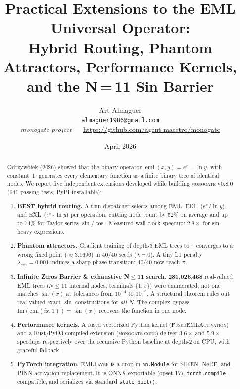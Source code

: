 \documentclass[11pt,a4paper]{article}
\title{%
  Practical Extensions to the EML Universal Operator:\\
  Hybrid Routing, Phantom Attractors, Performance Kernels,\\
  and the N{\,}={\,}11 Sin Barrier
}
\author{Art Almaguer\\
  \small \texttt{almaguer1986@gmail.com}\\[2pt]
  \small \textit{monogate project} --- \url{https://github.com/agent-maestro/monogate}
}
\date{April 2026}
\begin{document}
\maketitle

\begin{abstract}
Odrzyw\'{o}\l{}ek (2026) showed that the binary operator
$\operatorname{eml}(x,y)=e^x - \ln y$, with constant~$1$, generates
every elementary function as a finite binary tree of identical nodes.
We report five independent extensions developed while building
\textsc{monogate} v0.8.0 (641 passing tests, PyPI-installable):

\begin{enumerate}
  \item \textbf{BEST hybrid routing.}
    A thin dispatcher selects among EML, EDL~($e^x/\ln y$), and
    EXL~($e^x \cdot \ln y$) per operation, cutting node count by 52\%
    on average and up to 74\% for Taylor-series $\sin/\cos$.
    Measured wall-clock speedup: $2.8\times$ for sin-heavy expressions.

  \item \textbf{Phantom attractors.}
    Gradient training of depth-3 EML trees to $\pi$ converges to a
    wrong fixed point ($\approx 3.1696$) in 40/40 seeds ($\lambda=0$).
    A tiny L1 penalty $\lambda_{\text{crit}}=0.001$ induces a sharp
    phase transition: 40/40 now reach $\pi$.

  \item \textbf{Infinite Zeros Barrier \& exhaustive N$\leq$11 search.}
    \textbf{281,026,468} real-valued EML trees ($N\leq11$ internal nodes,
    terminals $\{1,x\}$) were enumerated; not one matches $\sin(x)$ at
    tolerances from $10^{-4}$ to $10^{-9}$.
    A structural theorem rules out real-valued exact-$\sin$ constructions
    for \emph{all} $N$.  The complex bypass $\mathrm{Im}(\mathrm{eml}(ix,1))=\sin(x)$
    recovers the function in one node.

  \item \textbf{Performance kernels.}
    A fused vectorized Python kernel (\textsc{FusedEMLActivation}) and a
    Rust/PyO3 compiled extension (\textsc{monogate-core}) deliver $3.6\times$
    and $5.9\times$ speedups respectively over the recursive Python baseline
    at depth-2 on CPU, with graceful fallback.

  \item \textbf{PyTorch integration.}
    \textsc{EMLLayer} is a drop-in \texttt{nn.Module} for SIREN, NeRF, and
    PINN activation replacement.  It is ONNX-exportable (opset 17),
    \texttt{torch.compile}-compatible, and serializes via standard
    \texttt{state\_dict()}.
\end{enumerate}


\end{abstract}
\end{document}
